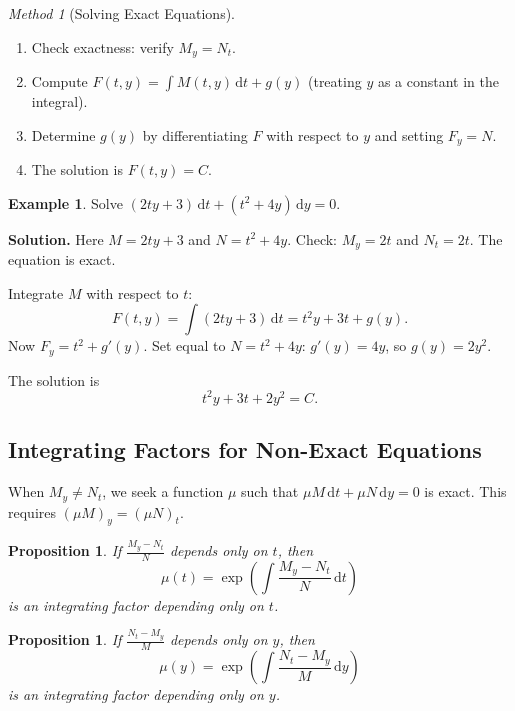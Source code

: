 \documentclass[12pt,a4paper,openany]{book}
\theoremstyle{definition}
\newtheorem{example}[definition]{Example}
\theoremstyle{plain}
\newtheorem{proposition}[definition]{Proposition}
\theoremstyle{remark}
\newtheorem{method}[definition]{Method}
\newcommand{\dd}{\mathrm{d}}
\begin{document}
\begin{method}[Solving Exact Equations]
\label{meth:exact}
\begin{enumerate}[label=\textbf{Step~\arabic*:}]
  \item Check exactness: verify $M_y = N_t$.
  \item Compute $F(t,y) = \int M(t,y)\,\dd t + g(y)$ (treating $y$ as a constant in the integral).
  \item Determine $g(y)$ by differentiating $F$ with respect to $y$ and setting $F_y = N$.
  \item The solution is $F(t,y)=C$.
\end{enumerate}
\end{method}

\begin{example}
\label{ex:exact-1}
Solve $(2ty + 3)\,\dd t + (t^2 + 4y)\,\dd y = 0$.

\textbf{Solution.} Here $M = 2ty+3$ and $N = t^2+4y$. Check: $M_y = 2t$ and $N_t = 2t$. The equation is exact.

Integrate $M$ with respect to $t$:
\[
  F(t,y) = \int(2ty+3)\,\dd t = t^2 y + 3t + g(y).
\]
Now $F_y = t^2 + g'(y)$. Set equal to $N = t^2 + 4y$: $g'(y) = 4y$, so $g(y) = 2y^2$.

The solution is
\[
  t^2 y + 3t + 2y^2 = C.
\]
\end{example}

\subsection{Integrating Factors for Non-Exact Equations}
\label{subsec:integrating-factors-exact}

When $M_y \ne N_t$, we seek a function $\mu$ such that $\mu M\,\dd t + \mu N\,\dd y = 0$ is exact. This requires $(\mu M)_y = (\mu N)_t$.

\begin{proposition}
\label{prop:integrating-factor-t}
If $\displaystyle\frac{M_y - N_t}{N}$ depends only on $t$, then
\[
  \mu(t) = \exp\!\left(\int \frac{M_y - N_t}{N}\,\dd t\right)
\]
is an integrating factor depending only on $t$.
\end{proposition}

\begin{proposition}
\label{prop:integrating-factor-y}
If $\displaystyle\frac{N_t - M_y}{M}$ depends only on $y$, then
\[
  \mu(y) = \exp\!\left(\int \frac{N_t - M_y}{M}\,\dd y\right)
\]
is an integrating factor depending only on $y$.
\end{proposition}
\end{document}
